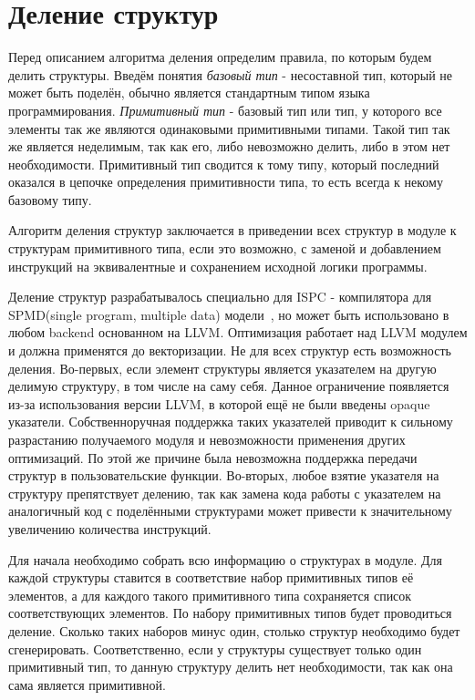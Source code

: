 \section{Деление структур}
\label{sec:Background}

Перед описанием алгоритма деления определим правила, по которым будем делить структуры.
Введём понятия \emph{базовый тип} - несоставной тип, который не может быть поделён, обычно является стандартным типом языка программирования.
\emph{Примитивный тип} - базовый тип или тип, у которого все элементы так же являются одинаковыми примитивными типами.
Такой тип так же является неделимым, так как его, либо невозможно делить, либо в этом нет необходимости.
Примитивный тип сводится к тому типу, который последний оказался в цепочке определения примитивности типа, то есть всегда к некому базовому типу.

Алгоритм деления структур заключается в приведении всех структур в модуле к структурам примитивного типа, если это возможно, с заменой и добавлением инструкций на эквивалентные и сохранением исходной логики программы.

Деление структур разрабатывалось специально для ISPC - компилятора для SPMD(single program, multiple data) модели~\cite{ISPC}, но может быть использовано в любом backend основанном на LLVM.
Оптимизация работает над LLVM модулем и должна применятся до векторизации.
Не для всех структур есть возможность деления.
Во-первых, если элемент структуры является указателем на другую делимую структуру, в том числе на саму себя.
Данное ограничение появляется из-за использования версии LLVM, в которой ещё не были введены opaque указатели.
Собственноручная поддержка таких указателей приводит к сильному разрастанию получаемого модуля и невозможности применения других оптимизаций.
По этой же причине была невозможна поддержка передачи структур в пользовательские функции.
Во-вторых, любое взятие указателя на структуру препятствует делению, так как замена кода работы с указателем на аналогичный код с поделёнными структурами может привести к значительному увеличению количества инструкций.

Для начала необходимо собрать всю информацию о структурах в модуле.
Для каждой структуры ставится в соответствие набор примитивных типов её элементов, а для каждого такого примитивного типа сохраняется список соответствующих элементов.
По набору примитивных типов будет проводиться деление.
Сколько таких наборов минус один, столько структур необходимо будет сгенерировать.
Соответственно, если у структуры существует только один примитивный тип, то данную структуру делить нет необходимости, так как она сама является примитивной.

